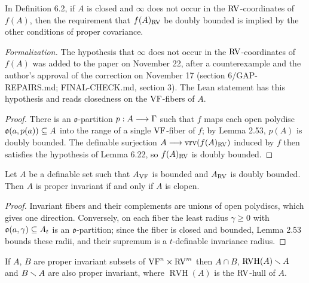 \setcounter{theorem}{3}
\begin{remark}
\label{s6-closed-image-db}
\leanok
{}
In Definition 6.2, if $A$ is closed and $\infty$ does not occur in the $\mathrm{RV}$-coordinates of $f(A)$, then the requirement that $f(A)_{\mathrm{RV}}$ be doubly bounded is implied by the other conditions of proper covariance.

\emph{Formalization.} The hypothesis that $\infty$ does not occur in the $\mathrm{RV}$-coordinates of $f(A)$ was added to the paper on November 22, after a counterexample and the author's approval of the correction on November 17 (section 6/GAP-REPAIRS.md; FINAL-CHECK.md, section 3). The Lean statement has this hypothesis and reads closedness on the $\mathrm{VF}$-fibers of $A$.
\end{remark}

\begin{proof}
\leanok
There is an $\mathfrak{o}$-partition $p:A\longrightarrow\Gamma$ such that $f$ maps each open polydisc $\mathfrak{o}(a,p(a))\subseteq A$ into the range of a single $\mathrm{VF}$-fiber of $f$; by Lemma 2.53, $p(A)$ is doubly bounded. The definable surjection $A\longrightarrow\operatorname{vrv}(f(A)_{\mathrm{RV}})$ induced by $f$ then satisfies the hypothesis of Lemma 6.22, so $f(A)_{\mathrm{RV}}$ is doubly bounded.
\end{proof}

\setcounter{theorem}{4}
\begin{lemma}
\label{inv-crit}
\leanok
{}
Let $A$ be a definable set such that $A_{\mathrm{VF}}$ is bounded and $A_{\mathrm{RV}}$ is doubly bounded. Then $A$ is proper invariant if and only if $A$ is clopen.
\end{lemma}

\begin{proof}
\leanok
Invariant fibers and their complements are unions of open polydiscs, which gives one direction. Conversely, on each fiber the least radius $\gamma\geq0$ with $\mathfrak{o}(a,\gamma)\subseteq A_t$ is an $\mathfrak{o}$-partition; since the fiber is closed and bounded, Lemma 2.53 bounds these radii, and their supremum is a $t$-definable invariance radius.
\end{proof}

\setcounter{theorem}{5}
\begin{lemma}
\label{int-inv}
\leanok
{}
If $A$, $B$ are proper invariant subsets of $\mathrm{VF}^n\times\mathrm{RV}^m$ then $A\cap B$, $\operatorname{RVH}(A)\smallsetminus A$ and $B\smallsetminus A$ are also proper invariant, where $\operatorname{RVH}(A)$ is the $\mathrm{RV}$-hull of $A$.
\end{lemma}

